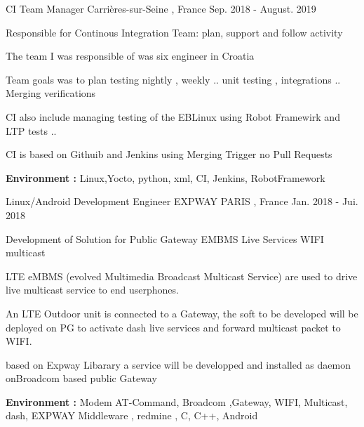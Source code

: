 \begin{cventries}
\cventry
{CI Team Manager} %
{} %
{Carrières-sur-Seine , France} %
{Sep. 2018 - August. 2019} %
{ %
\begin{cvitems}
\item {Responsible for Continous Integration Team: plan, support and follow activity}
\item {The team I was responsible of was  six engineer in Croatia }
\item {Team goals was to plan testing nightly , weekly .. unit testing , integrations .. Merging verifications  }
\item {CI also include managing testing of the EBLinux using Robot Framewirk and LTP tests ..  }
\item {CI is based on Githuib and Jenkins using Merging Trigger no Pull Requests}
\item { \textbf{Environment :} Linux,Yocto, python, xml, CI, Jenkins, RobotFramework}
\end{cvitems}
}


\cventry
{Linux/Android Development Engineer } %
{EXPWAY} %
{PARIS , France} %
{Jan. 2018 - Jui. 2018} %
{ %
\begin{cvitems}
\item {Development of Solution for Public Gateway EMBMS Live Services WIFI multicast}
\item {LTE eMBMS (evolved Multimedia Broadcast Multicast Service) are used to drive live multicast service to end userphones.}
\item { An LTE  Outdoor unit is connected to a Gateway, the soft to be developed will be deployed on PG to activate dash live services and forward multicast packet to WIFI.}
\item {based on Expway Libarary a service will be developped and installed as daemon onBroadcom based public Gateway}
\item { \textbf{Environment :} Modem AT-Command, Broadcom ,Gateway, WIFI, Multicast, dash, EXPWAY Middleware , redmine , C, C++, Android}
\end{cvitems}
}




\end{cventries}
